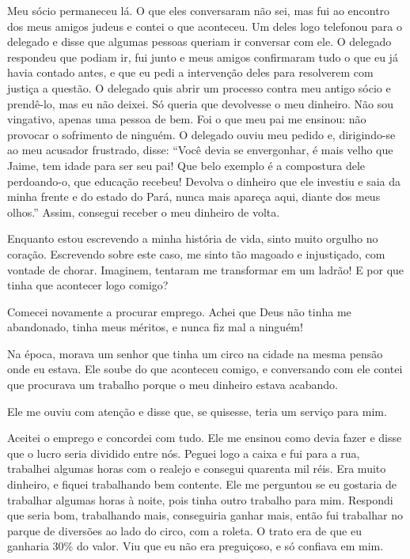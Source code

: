 Meu sócio permaneceu lá. O que eles conversaram não sei, mas fui ao
encontro dos meus amigos judeus e contei o que aconteceu. Um deles
logo telefonou para o delegado e disse que algumas pessoas queriam ir
conversar com ele. O delegado respondeu que podiam ir, fui junto e 
meus amigos confirmaram tudo o que eu já havia contado antes, e que eu
pedi a intervenção deles para resolverem com justiça a questão. O
delegado quis abrir um processo contra meu antigo sócio e prendê-lo,
mas eu não deixei. Só queria que devolvesse o meu dinheiro. Não sou
vingativo, apenas uma pessoa de bem. Foi o que meu pai me ensinou: não
provocar o sofrimento de ninguém. O delegado ouviu meu pedido e,
dirigindo-se ao meu acusador frustrado, disse: ``Você devia se
envergonhar, é mais velho que Jaime, tem idade para ser seu pai! Que
belo exemplo é a compostura dele perdoando-o, que educação recebeu!
Devolva o dinheiro que ele investiu e saia da minha frente e do estado
do Pará, nunca mais apareça aqui, diante dos meus olhos.'' Assim, 
consegui receber o meu dinheiro de volta.

Enquanto estou escrevendo a minha história de vida, sinto muito orgulho
no coração. Escrevendo sobre este caso, me sinto tão magoado e
injustiçado, com vontade de chorar. Imaginem, tentaram me transformar em
um ladrão! E por que tinha que acontecer logo comigo?

Comecei novamente a procurar emprego. Achei
que Deus não tinha me abandonado, tinha meus méritos, e nunca fiz 
mal a ninguém! 

Na época, morava
um senhor que tinha um circo na cidade na mesma pensão onde eu estava. Ele soube do que
aconteceu comigo, e conversando com ele contei que procurava um trabalho
porque o meu dinheiro estava acabando.

Ele me ouviu com atenção e disse que, se quisesse, teria um serviço para
mim.


Aceitei o emprego e concordei com tudo. Ele me ensinou como devia fazer
e disse que o lucro seria dividido entre nós. Peguei logo a caixa e
fui para a rua, trabalhei algumas horas com o realejo e consegui quarenta
mil réis. Era muito dinheiro, e fiquei trabalhando bem contente.
Ele me perguntou se eu gostaria de trabalhar algumas horas à noite, pois
tinha outro trabalho para mim. Respondi que seria bom, trabalhando mais,
conseguiria ganhar mais, então fui trabalhar no parque de diversões ao
lado do circo, com a roleta. O trato era de que eu ganharia 30\% do valor. Viu que eu
não era preguiçoso, e só confiava em mim.

